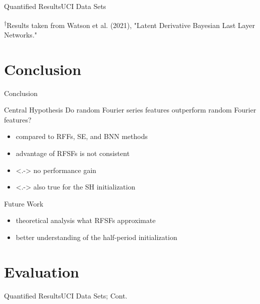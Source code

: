 \documentclass[
	USenglish,
	aspectratio=43,
	color={accentcolor=1c},
	logo=true,
	colorframetitle=true,
	hyperref={pdfpagelabels=true},
]{tudabeamer}
\newcommand{\hypOne}{
	\begin{block}{Central Hypothesis}
		Do random Fourier series features outperform random Fourier features?
	\end{block}
}
\begin{document}
		\begin{frame}{Quantified Results}{UCI Data Sets}
			\begin{center}
				\tiny
				\tabResultsUciJoe

				\vspace{1pt}
				\textsuperscript{\(\dagger\)}Results taken from Watson et al. (2021), "Latent Derivative Bayesian Last Layer Networks."
			\end{center}
		\end{frame}
		\endgroup

	\section{Conclusion}
		\begin{frame}{Conclusion}
			\hypOne

			\begin{itemize}
				\item<+-> compared to RFFs, SE, and BNN methods
				\item<+-> advantage of RFSFs is not consistent
				\item<.-> no performance gain
				\item<.-> also true for the SH initialization
			\end{itemize}
		\end{frame}

		\begin{frame}{Future Work}
			\begin{itemize}
				\item theoretical analysis what RFSFs approximate
				\item better understanding of the half-period initialization
			\end{itemize}
		\end{frame}


	\appendix
	\section{Evaluation}
		\begin{frame}{Quantified Results}{UCI Data Sets; Cont.}
			\begin{center}
				\tiny
				\tabResultsUciRest
			\end{center}
		\end{frame}
\end{document}
